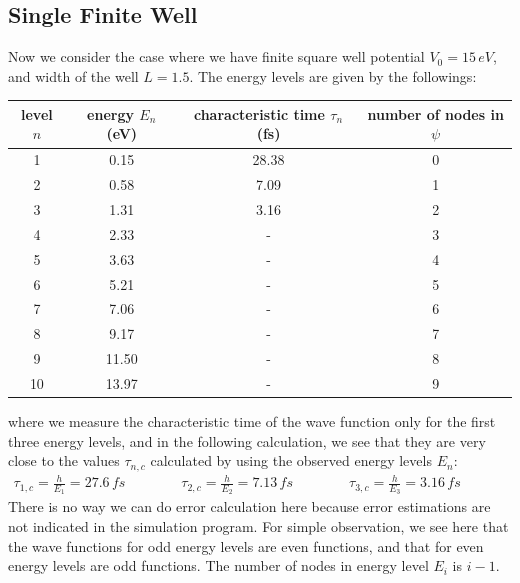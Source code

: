\documentclass[11pt]{book}
\theoremstyle{break}
\theoremstyle{break}
\begin{document}
\subsection{Single Finite Well}
Now we consider the case where we have finite square well potential $V_0 = 15\, eV$, and width of the well $L=1.5$. The energy levels are given by the followings:
\begin{center}
\begin{tabular}{|c|c|c|c|}
\hline
level $n$ & energy $E_n$ (eV) & characteristic time $\tau_n$ (fs)& number of nodes in $\psi$ \\
\hline
1 & 0.15 & 28.38 & 0\\
\hline
2 & 0.58 & 7.09 & 1\\
\hline
3 & 1.31 & 3.16 & 2\\
\hline
4 & 2.33 & - & 3\\
\hline
5 & 3.63 & - & 4\\
\hline
6 & 5.21 & - & 5\\
\hline
7 & 7.06 & - & 6\\
\hline
8 & 9.17 & - & 7\\
\hline
9 & 11.50 & - &8\\
\hline
10 & 13.97 & - & 9\\
\hline
\end{tabular}
\end{center}
where we measure the characteristic time of the wave function only for the first three energy levels, and in the following calculation, we see that they are very close to the values $\tau_{n,c}$ calculated by using the observed energy levels $E_n$:
\begin{align*}
\tau_{1,c} = \frac{h}{E_1} = 27.6\, fs \qquad\qquad
\tau_{2,c} = \frac{h}{E_2} = 7.13\, fs \qquad\qquad
\tau_{3,c} = \frac{h}{E_3} = 3.16\, fs \qquad\qquad
\end{align*}
There is no way we can do error calculation here because error estimations are not indicated in the simulation program. For simple observation, we see here that the wave functions for odd energy levels are even functions, and that for even energy levels are odd functions. The number of nodes in energy level $E_i$ is $i-1$. 
\end{document}
